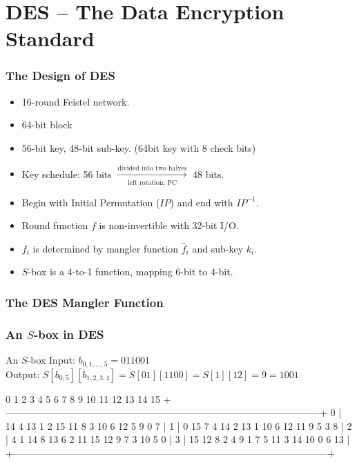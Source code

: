 \section{DES -- The Data Encryption Standard}
\begin{frame}\frametitle{The Design of DES}
\begin{itemize}
\item 16-round Feistel network.
\item 64-bit block
\item 56-bit key, 48-bit sub-key. (64bit key with 8 check bits)
\item Key schedule: 56 bits $\xrightarrow[\text{left rotation, PC}]{\text{divided into two halves}}$ 48 bits.
\item Begin with Initial Permutation ($IP$) and end with $IP^{-1}$.
\item Round function $f$ is non-invertible with 32-bit I/O.
\item $f_i$ is determined by mangler function $\hat{f}_i$ and sub-key $k_i$.
\item $S$-box is a 4-to-1 function, mapping 6-bit to 4-bit.
\end{itemize}
\end{frame}
\begin{frame}\frametitle{The DES Mangler Function}
\begin{figure}
\begin{center}

\end{center}
\end{figure}
\end{frame}
\begin{frame}[fragile]\frametitle{An $S$-box in DES}
\begin{exampleblock}{An $S$-box}	
Input: $b_{0,1,...,5}=011001$\\
Output: $S[b_{0,5}][b_{1,2,3,4}]=S[01][1100]=S[1][12]=9=1001$
\begin{semiverbatim}
     0  1  2  3  4  5  6  7  8  9 10 11 12 13 14 15
  +--------------------------------------------------------------------------------------------------+
0 | 14  4 13  1  2 15 11  8  3 10  6 12  5  9  0  7 |
1 |  0 15  7  4 14  2 13  1 10  6 12 11  \alert{9}  5  3  8 |
2 |  4  1 14  8 13  6  2 11 15 12  9  7  3 10  5  0 |
3 | 15 12  8  2  4  9  1  7  5 11  3 14 10  0  6 13 |
  +--------------------------------------------------------------------------------------------------+
\end{semiverbatim}
\end{exampleblock}
\end{frame}
